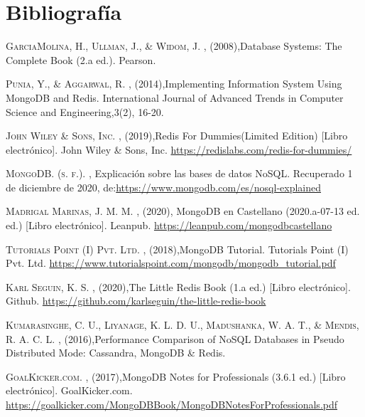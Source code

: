 \documentclass[twocolumn]{article}
\begin{document}
\section{Bibliografía}

\begin{thebibliography}{X}
   \textsc{Garcia\-Molina, H., Ullman, J., \& Widom, J. } ,
  \textit{}(2008),Database Systems: The Complete Book (2.a ed.). Pearson.
  
   \textsc{Punia, Y., \& Aggarwal, R. } ,
  \textit{}(2014),Implementing Information System Using MongoDB and Redis. International Journal of Advanced Trends in Computer Science and Engineering,3(2), 16-20.
  
   \textsc{John Wiley \& Sons, Inc.  } ,
  \textit{}(2019),Redis For Dummies(Limited Edition) [Libro electrónico]. John Wiley \& Sons, Inc. \url{https://redislabs.com/redis-for-dummies/}

   \textsc{MongoDB. (s. f.).} ,
  \textit{}Explicación sobre las bases de datos NoSQL. Recuperado 1 de diciembre de 2020, de:\url{https://www.mongodb.com/es/nosql-explained}

   \textsc{Madrigal Marinas, J. M. M. } ,
  \textit{}(2020), MongoDB en Castellano (2020.a-07-13 ed. ed.) [Libro electrónico]. Leanpub. \url{https://leanpub.com/mongodbcastellano}

   \textsc{Tutorials Point (I) Pvt. Ltd.} ,
  \textit{}(2018),MongoDB Tutorial. Tutorials Point (I) Pvt. Ltd. \url{https://www.tutorialspoint.com/mongodb/mongodb_tutorial.pdf}

   \textsc{Karl Seguin, K. S. } ,
  \textit{}(2020),The Little Redis Book (1.a ed.) [Libro electrónico]. Github. \url{https://github.com/karlseguin/the-little-redis-book}

   \textsc{Kumarasinghe, C. U., Liyanage, K. L. D. U., Madushanka, W. A. T., \& Mendis, R. A. C. L. } ,
  \textit{}(2016),Performance Comparison of NoSQL Databases in Pseudo Distributed Mode: Cassandra, MongoDB \& Redis.

\newpage
   \textsc{GoalKicker.com.  } ,
  \textit{}(2017),MongoDB Notes for Professionals (3.6.1 ed.) [Libro electrónico]. GoalKicker.com. \url{https://goalkicker.com/MongoDBBook/MongoDBNotesForProfessionals.pdf}

\end{thebibliography}
\end{document}
